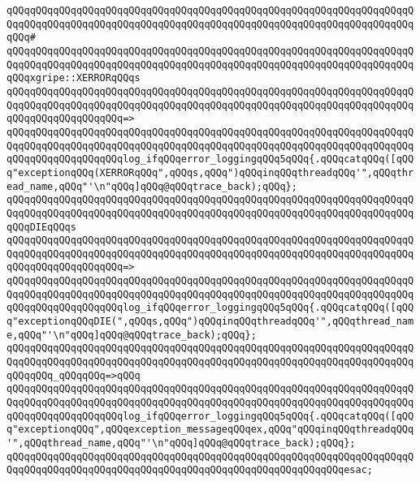 \verb|qQQqqQQqqQQqqQQqqQQqqQQqqQQqqQQqqQQqqQQqqQQqqQQqqQQqqQQqqQQqqQQqqQQqqQQqqQQqqQQqqQQqqQQqqQQqqQQqqQQqqQQqqQQqqQQqqQQqqQQqqQQqqQQqqQQqqQQqqQQqqQQq#|\newline
\verb|qQQqqQQqqQQqqQQqqQQqqQQqqQQqqQQqqQQqqQQqqQQqqQQqqQQqqQQqqQQqqQQqqQQqqQQqqQQqqQQqqQQqqQQqqQQqqQQqqQQqqQQqqQQqqQQqqQQqqQQqqQQqqQQqqQQqqQQqqQQqqQQqxgripe::XERRORqQQqs|\newline
\verb|qQQqqQQqqQQqqQQqqQQqqQQqqQQqqQQqqQQqqQQqqQQqqQQqqQQqqQQqqQQqqQQqqQQqqQQqqQQqqQQqqQQqqQQqqQQqqQQqqQQqqQQqqQQqqQQqqQQqqQQqqQQqqQQqqQQqqQQqqQQqqQQqqQQqqQQqqQQqqQQq=>|\newline
\verb|qQQqqQQqqQQqqQQqqQQqqQQqqQQqqQQqqQQqqQQqqQQqqQQqqQQqqQQqqQQqqQQqqQQqqQQqqQQqqQQqqQQqqQQqqQQqqQQqqQQqqQQqqQQqqQQqqQQqqQQqqQQqqQQqqQQqqQQqqQQqqQQqqQQqqQQqqQQqqQQqlog_ifqQQqerror_loggingqQQq5qQQq{.qQQqcatqQQq([qQQq"exceptionqQQq(XERRORqQQq",qQQqs,qQQq")qQQqinqQQqthreadqQQq'",qQQqthread_name,qQQq"'\n"qQQq]qQQq@qQQqtrace_back);qQQq};|\newline
\newline
\verb|qQQqqQQqqQQqqQQqqQQqqQQqqQQqqQQqqQQqqQQqqQQqqQQqqQQqqQQqqQQqqQQqqQQqqQQqqQQqqQQqqQQqqQQqqQQqqQQqqQQqqQQqqQQqqQQqqQQqqQQqqQQqqQQqqQQqqQQqqQQqqQQqDIEqQQqs|\newline
\verb|qQQqqQQqqQQqqQQqqQQqqQQqqQQqqQQqqQQqqQQqqQQqqQQqqQQqqQQqqQQqqQQqqQQqqQQqqQQqqQQqqQQqqQQqqQQqqQQqqQQqqQQqqQQqqQQqqQQqqQQqqQQqqQQqqQQqqQQqqQQqqQQqqQQqqQQqqQQqqQQq=>|\newline
\verb|qQQqqQQqqQQqqQQqqQQqqQQqqQQqqQQqqQQqqQQqqQQqqQQqqQQqqQQqqQQqqQQqqQQqqQQqqQQqqQQqqQQqqQQqqQQqqQQqqQQqqQQqqQQqqQQqqQQqqQQqqQQqqQQqqQQqqQQqqQQqqQQqqQQqqQQqqQQqqQQqlog_ifqQQqerror_loggingqQQq5qQQq{.qQQqcatqQQq([qQQq"exceptionqQQqDIE(",qQQqs,qQQq")qQQqinqQQqthreadqQQq'",qQQqthread_name,qQQq"'\n"qQQq]qQQq@qQQqtrace_back);qQQq};|\newline
\newline
\verb|qQQqqQQqqQQqqQQqqQQqqQQqqQQqqQQqqQQqqQQqqQQqqQQqqQQqqQQqqQQqqQQqqQQqqQQqqQQqqQQqqQQqqQQqqQQqqQQqqQQqqQQqqQQqqQQqqQQqqQQqqQQqqQQqqQQqqQQqqQQqqQQqqQQq_qQQqqQQq=>qQQq|\newline
\verb|qQQqqQQqqQQqqQQqqQQqqQQqqQQqqQQqqQQqqQQqqQQqqQQqqQQqqQQqqQQqqQQqqQQqqQQqqQQqqQQqqQQqqQQqqQQqqQQqqQQqqQQqqQQqqQQqqQQqqQQqqQQqqQQqqQQqqQQqqQQqqQQqqQQqqQQqqQQqqQQqlog_ifqQQqerror_loggingqQQq5qQQq{.qQQqcatqQQq([qQQq"exceptionqQQq",qQQqexception_messageqQQqex,qQQq"qQQqinqQQqthreadqQQq'",qQQqthread_name,qQQq"'\n"qQQq]qQQq@qQQqtrace_back);qQQq};|\newline
\verb|qQQqqQQqqQQqqQQqqQQqqQQqqQQqqQQqqQQqqQQqqQQqqQQqqQQqqQQqqQQqqQQqqQQqqQQqqQQqqQQqqQQqqQQqqQQqqQQqqQQqqQQqqQQqqQQqqQQqqQQqqQQqqQQqesac;|\newline
